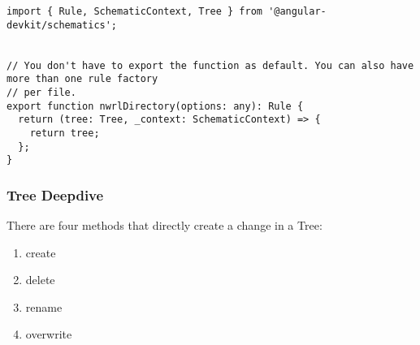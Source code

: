 \begin{lstlisting}
import { Rule, SchematicContext, Tree } from '@angular-devkit/schematics';


// You don't have to export the function as default. You can also have more than one rule factory
// per file.
export function nwrlDirectory(options: any): Rule {
  return (tree: Tree, _context: SchematicContext) => {
    return tree;
  };
}
\end{lstlisting}


\subsubsection{ Tree Deepdive}
There are four methods that directly create a change in a Tree:
\begin{enumerate}
  \item create
  \item delete
  \item rename
  \item overwrite
\end{enumerate}
